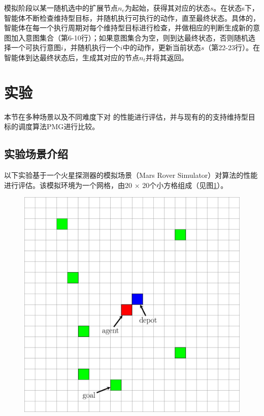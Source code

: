 模拟阶段以某一随机选中的扩展节点$n_e$为起始，获得其对应的状态$s$。在状态s下，智能体不断检查维持型目标，并随机执行可执行的动作，直至最终状态。具体的，智能体在每一个执行周期对每个维持型目标进行检查，并做相应的判断生成新的意图加入意图集合（第6-10行）；如果意图集合为空，则到达最终状态，否则随机选择一个可执行意图$i$，并随机执行一个$i$中的动作，更新当前状态$s$（第22-23行）。在智能体到达最终状态后，生成其对应的节点$n_t$并将其返回。

\section{实验}
本节在多种场景以及不同难度下对 \SAM 的性能进行评估，并与现有的的支持维持型目标的调度算法PMG\cite{DBLP:conf/atal/DuffHT06}进行比较。

\subsection{实验场景介绍}
以下实验基于一个火星探测器的模拟场景（Mars Rover Simulator）对\SAM 算法的性能进行评估。该模拟环境为一个网格，由20 $\times$ 20个小方格组成（见图\ref{fig:marsrover}）。
\begin{figure}[h!]
\centering
\includegraphics[scale=0.4]{./figs/mg_example}
\captionsetup{justification=centering}
\label{fig:marsrover}
\end{figure}


